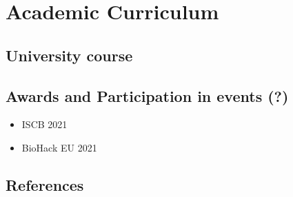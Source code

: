 \hypertarget{academic-curriculum}{%
\section{Academic Curriculum}\label{academic-curriculum}}

\hypertarget{university-course}{%
\subsection{University course}\label{university-course}}

\hypertarget{awards-and-participation-in-events}{%
\subsection{Awards and Participation in events (?)}\label{awards-and-participation-in-events}}

\begin{itemize}
\tightlist
\item
  ISCB 2021
\item
  BioHack EU 2021
\end{itemize}

\hypertarget{references}{%
\subsection{References}\label{references}}

